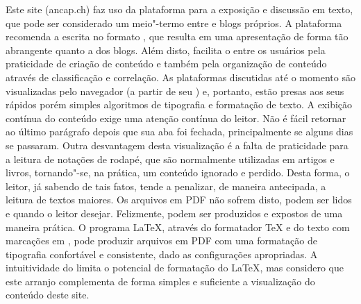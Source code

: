 {}Este site (ancap.ch) faz uso da plataforma  para a exposição e discussão em texto, que pode ser considerado um meio"-termo entre  e blogs próprios. A plataforma  recomenda a escrita no formato , que resulta em uma apresentação de forma tão abrangente quanto a dos blogs. Além disto, facilita o  entre os usuários pela praticidade de criação de conteúdo e também pela organização de conteúdo através de classificação e correlação.\markdownRendererInterblockSeparator
{}\markdownRendererInterblockSeparator
{}As plataformas discutidas até o momento são visualizadas pelo navegador (a partir de seu ) e, portanto, estão presas aos seus rápidos porém simples algoritmos de tipografia e formatação de texto. A exibição contínua do conteúdo exige uma atenção contínua do leitor. Não é fácil retornar ao último parágrafo depois que sua aba foi fechada, principalmente se alguns dias se passaram. Outra desvantagem desta visualização é a falta de praticidade para a leitura de notações de rodapé, que são normalmente utilizadas em artigos e livros, tornando"-se, na prática, um conteúdo ignorado e perdido. Desta forma, o leitor, já sabendo de tais fatos, tende a penalizar, de maneira antecipada, a leitura de textos maiores.\markdownRendererInterblockSeparator
{}Os arquivos em PDF não sofrem disto, podem ser lidos  e quando o leitor desejar. Felizmente, podem ser produzidos e expostos de uma maneira prática.\markdownRendererInterblockSeparator
{}O programa \LaTeX{}, através do formatador \TeX{} e do texto com marcações em , pode produzir arquivos em PDF com uma formatação de tipografia confortável e consistente, dado as configurações apropriadas. A intuitividade do  limita o potencial de formatação do \LaTeX, mas considero que este arranjo complementa de forma simples e suficiente a visualização do conteúdo deste site.\markdownRendererInterblockSeparator

